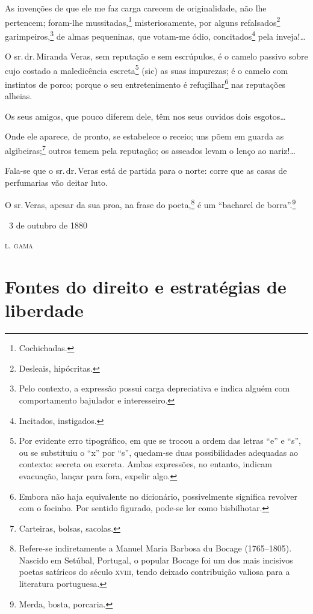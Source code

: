 As invenções de que ele me faz carga carecem de originalidade, não lhe
pertencem; foram-lhe mussitadas,\footnote{Cochichadas.}
misteriosamente, por alguns refalsados\footnote{Desleais, hipócritas.}
garimpeiros,\footnote{Pelo contexto, a expressão possui carga
  depreciativa e indica alguém com comportamento bajulador e
  interesseiro.} de almas pequeninas, que votam-me ódio,
concitados\footnote{Incitados, instigados.} pela inveja!\ldots{}

O sr.\,dr.\,Miranda Veras, sem reputação e sem escrúpulos, é o camelo
passivo sobre cujo costado a maledicência escreta\footnote{Por
  evidente erro tipográfico, em que se trocou a ordem das letras ``e'' e
  ``s'', ou se substituiu o ``x'' por ``s'', quedam-se duas possibilidades
  adequadas ao contexto: secreta ou excreta. Ambas expressões, no
  entanto, indicam evacuação, lançar para fora, expelir algo.} (sic) as
suas impurezas; é o camelo com instintos de porco; porque o seu
entretenimento é refuçilhar\footnote{Embora não haja equivalente no
  dicionário, possivelmente significa revolver com o focinho. Por
  sentido figurado, pode-se ler como bisbilhotar.} nas reputações
alheias.

Os seus amigos, que pouco diferem dele, têm nos seus ouvidos dois
esgotos\ldots{}

Onde ele aparece, de pronto, se estabelece o receio; uns põem em guarda
as algibeiras;\footnote{Carteiras, bolsas, sacolas.} outros temem pela
reputação; os asseados levam o lenço ao nariz!\ldots{}

Fala-se que o sr.\,dr.\,Veras está de partida para o norte: corre que as %
casas de perfumarias vão deitar luto.

O sr.\,Veras, apesar da sua proa, na frase do poeta,\footnote{Refere-se
  indiretamente a Manuel Maria Barbosa du Bocage (1765--1805). Nascido em
  Setúbal, Portugal, o popular Bocage foi um dos mais incisivos poetas
  satíricos do século \textsc{xviii}, tendo deixado contribuição valiosa para a
  literatura portuguesa.} é um ``bacharel de borra''.\footnote{Merda,
  bosta, porcaria.}\medskip

\hfill\ 3 de outubro de 1880

\hfill\textsc{l. gama}

\part{Fontes do direito e estratégias de liberdade}

